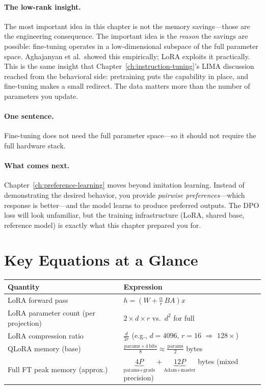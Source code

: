 \paragraph{The low-rank insight.} The most important idea in this chapter is not the memory savings---those are the engineering consequence. The important idea is the \emph{reason} the savings are possible: fine-tuning operates in a low-dimensional subspace of the full parameter space. Aghajanyan et al.\ showed this empirically; LoRA exploits it practically. This is the same insight that Chapter~\ref{ch:instruction-tuning}'s LIMA discussion reached from the behavioral side: pretraining puts the capability in place, and fine-tuning makes a small redirect. The data matters more than the number of parameters you update.

\paragraph{One sentence.} Fine-tuning does not need the full parameter space---so it should not require the full hardware stack.

\paragraph{What comes next.} Chapter~\ref{ch:preference-learning} moves beyond imitation learning. Instead of demonstrating the desired behavior, you provide \emph{pairwise preferences}---which response is better---and the model learns to produce preferred outputs. The DPO loss will look unfamiliar, but the training infrastructure (LoRA, shared base, reference model) is exactly what this chapter prepared you for.


\section*{Key Equations at a Glance}

\begin{center}
\begin{tabularx}{\textwidth}{@{}p{5cm}X@{}}
\toprule
\textbf{Quantity} & \textbf{Expression} \\
\midrule
LoRA forward pass & $h = \left(W + \frac{\alpha}{r}\, BA\right) x$ \\[4pt]
LoRA parameter count (per projection) & $2 \times d \times r$ \quad vs.\ $d^2$ for full \\[4pt]
LoRA compression ratio & $\frac{d}{2r}$ \quad (e.g., $d = 4096$, $r = 16$ $\Rightarrow$ $128\times$) \\[4pt]
QLoRA memory (base) & $\frac{\text{params} \times 4\,\text{bits}}{8} \approx \frac{\text{params}}{2}$ bytes \\[4pt]
Full FT peak memory (approx.) & $\underbrace{4P}_\text{params+grads} + \underbrace{12P}_\text{Adam+master}$ bytes (mixed precision) \\
\bottomrule
\end{tabularx}
\end{center}


